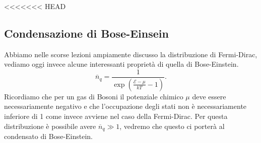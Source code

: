 <<<<<<< HEAD
\subsection{Condensazione di Bose-Einsein}%
Abbiamo nelle scorse lezioni ampiamente discusso la distribuzione di Fermi-Dirac, vediamo oggi invece alcune interessanti proprietà di quella di Bose-Einstein.
\[
	\overline{n}_{q} = \frac{1}{\exp\left( \frac{\mathcal{E} - \mu }{kT}-1 \right) }
.\]
Ricordiamo che per un gas di Bosoni il potenziale chimico $\mu $ deve essere necessariamente negativo e che l'occupazione degli stati non è necessariamente inferiore di 1 come invece avviene nel caso della Fermi-Dirac. Per questa distribuzione è possibile avere $\overline{n}_{q} \gg 1$, vedremo che questo ci porterà al condensato di Bose-Einstein.\\
